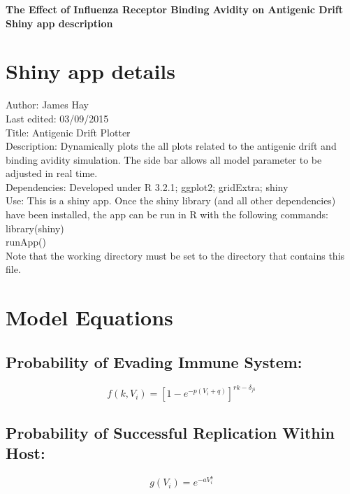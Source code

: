 \documentclass[a4paper,11pt,twoside]{article}
\begin{document}
\begin{center}
  \textbf{\LARGE The Effect of Influenza Receptor Binding Avidity on Antigenic Drift}\\[.5cm]
  \textbf{\Large Shiny app description}\\[.5cm]
\end{center}

\section*{Shiny app details}
Author: James Hay\\
Last edited: 03/09/2015\\
Title: Antigenic Drift Plotter\\
Description: Dynamically plots the all plots related to the antigenic drift and binding avidity simulation. The side bar allows all model parameter to be adjusted in real time.\\
Dependencies: Developed under R 3.2.1; ggplot2; gridExtra; shiny\\

Use: This is a shiny app. Once the shiny library (and all other dependencies) have been installed, the app can be run in R with the following commands:\\

library(shiny)\\
runApp()\\

Note that the working directory must be set to the directory that contains this file.\\

\section*{Model Equations}
\subsection*{Probability of Evading Immune System:}
\begin{equation}
  f(k,V_i) = [1-e^{-p(V_i+q)}]^{rk - \delta_{ji}}
\end{equation}

\subsection*{Probability of Successful Replication Within Host:}
\begin{equation}
g(V_i) = e^{-aV_i^b}
\end{equation}
\end{document}
